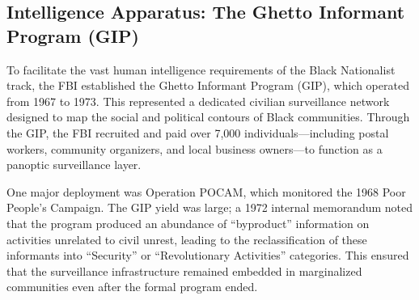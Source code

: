 \subsection{Intelligence Apparatus: The Ghetto Informant Program (GIP)}

To facilitate the vast human intelligence requirements of the Black Nationalist track, the FBI established the Ghetto Informant Program (GIP), which operated from 1967 to 1973. This represented a dedicated civilian surveillance network designed to map the social and political contours of Black communities. Through the GIP, the FBI recruited and paid over 7,000 individuals---including postal workers, community organizers, and local business owners---to function as a panoptic surveillance layer.

One major deployment was Operation POCAM, which monitored the 1968 Poor People's Campaign. The GIP yield was large; a 1972 internal memorandum noted that the program produced an abundance of ``byproduct'' information on activities unrelated to civil unrest, leading to the reclassification of these informants into ``Security'' or ``Revolutionary Activities'' categories. This ensured that the surveillance infrastructure remained embedded in marginalized communities even after the formal program ended.

